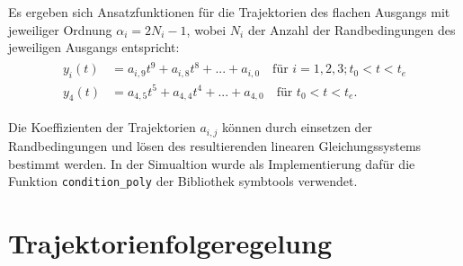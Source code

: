 Es ergeben sich Ansatzfunktionen für die Trajektorien des flachen Ausgangs mit jeweiliger Ordnung $\alpha_i = 2 N_i - 1$, wobei $N_i$ der Anzahl der Randbedingungen des jeweiligen Ausgangs entspricht:
\begin{align}
	\begin{split}
	y_i(t) &= a_{i, 9} t^9 + a_{i, 8} t^8 + ... + a_{i, 0} \quad \text{für }  i = 1,2,3; t_0 < t < t_e \\
	y_4(t) &= a_{4, 5} t^5 + a_{4, 4} t^4 + ... + a_{4, 0} \quad \text{für } t_0 < t < t_e.
	\end{split}
\end{align}

Die Koeffizienten der Trajektorien $a_{i, j}$ können durch einsetzen der Randbedingungen und lösen des resultierenden linearen Gleichungssystems bestimmt werden. In der Simualtion wurde als Implementierung dafür die Funktion \texttt{condition\_poly} der Bibliothek symbtools verwendet.


\section{Trajektorienfolgeregelung}

